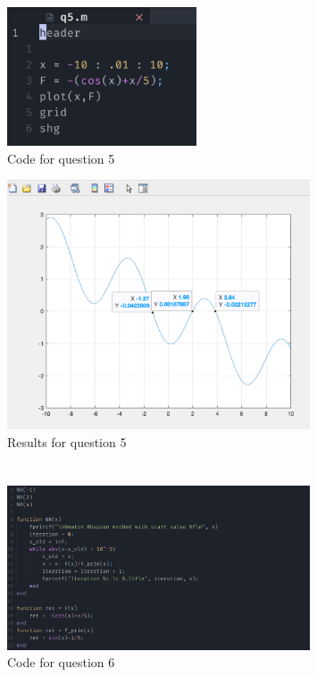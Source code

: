 \documentclass{article}
\begin{document}
\begin{figure}[H]
	\centering
	\includegraphics[width=0.5\textwidth]{imgs/q5_code.png}
	\caption{Code for question 5}
	\label{fig:q5_code}
\end{figure}

\begin{figure}[H]
	\centering
	\includegraphics[width=0.8\textwidth]{imgs/q5_results.png}
	\caption{Results for question 5}
	\label{fig:q5_result}
\end{figure}

\newpage
\section{}
\begin{figure}[H]
	\centering
	\includegraphics[width=0.8\textwidth]{imgs/q6_code.png}
	\caption{Code for question 6}
	\label{fig:q6_code}
\end{figure}
\end{document}
